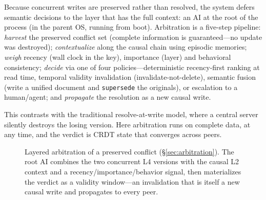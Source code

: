 \documentclass[11pt,twocolumn]{article}
\begin{document}
Because concurrent writes are preserved rather than resolved, the system
defers semantic decisions to the layer that has the full context: an AI at the
root of the process (in the parent OS, running from boot). Arbitration is a
five-step pipeline: \emph{harvest} the preserved conflict set (complete
information is guaranteed---no update was destroyed); \emph{contextualize}
along the causal chain using episodic memories; \emph{weigh} recency (wall
clock in the key), importance (layer) and behavioral consistency; \emph{decide}
via one of four policies---deterministic recency-first ranking at read time,
temporal validity invalidation (invalidate-not-delete), semantic fusion
(write a unified document and \texttt{supersede} the originals), or escalation
to a human/agent; and \emph{propagate} the resolution as a new causal write.

This contrasts with the traditional resolve-at-write model, where a central
server silently destroys the losing version. Here arbitration runs on complete
data, at any time, and the verdict is CRDT state that converges across peers.

\begin{figure}[t]
\centering
{}
\caption{Layered arbitration of a preserved conflict (\S\ref{sec:arbitration}).
The root AI combines the two concurrent L4 versions with the causal L2
context and a recency/importance/behavior signal, then materializes the verdict
as a validity window---an invalidation that is itself a new causal write and
propagates to every peer.}
\label{fig:arbitration}
\end{figure}
\end{document}
